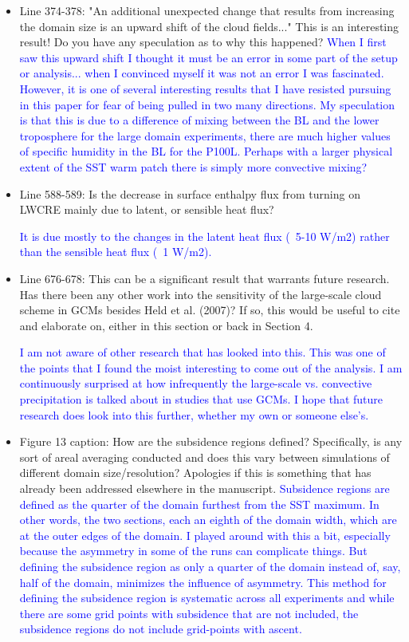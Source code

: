 \documentclass[draft]{agujournal2019}
\begin{document}
\begin{itemize}
  
  \item Line 374-378: "An additional unexpected change that results from increasing the domain size is an upward shift of the cloud fields..." This is an interesting result! Do you have any speculation as to why this happened?
  \textcolor{blue}{When I first saw this upward shift I thought it must be an error in some part of the setup or analysis... when I convinced myself it was not an error I was fascinated.  However, it is one of several interesting results that I have resisted
  pursuing in this paper for fear of being pulled in two many directions.  My speculation is that this is due to a difference of mixing between the BL and the lower troposphere for the large domain experiments, there are much higher values of specific humidity in the BL for the P100L.  Perhaps with a larger physical extent of the SST warm patch there is simply more convective mixing?}
  
  \item Line 588-589: Is the decrease in surface enthalpy flux from turning on LWCRE mainly due to latent, or sensible heat flux?  
  
  \textcolor{blue}{It is due mostly to the changes in the latent heat flux (~5-10 W/m2) rather than the sensible heat flux (~1 W/m2).}

  \item Line 676-678: This can be a significant result that warrants future research. Has there been any other work into the sensitivity of the large-scale cloud scheme in GCMs besides Held et al. (2007)? If so, this would be useful to cite and elaborate on, either in this section or back in Section 4.  
  
  \textcolor{blue}{I am not aware of other research that has looked into this.  This was one of the points that I found the moist interesting to come out of the analysis.  I am continuously surprised at how infrequently the large-scale vs. convective precipitation is talked about in studies that use GCMs.  I hope that future research does look into this further, whether my own or someone else’s.}
  
  \item Figure 13 caption: How are the subsidence regions defined? Specifically, is any sort of areal averaging conducted and does this vary between simulations of different domain size/resolution? Apologies if this is something that has already been addressed elsewhere in the manuscript.   
  \textcolor{blue}{Subsidence regions are defined as the quarter of the domain furthest from the SST 
  maximum.  In other words, the two sections, each an eighth of the domain width, which are at the outer edges of the domain.  I played around with this a bit, 
  especially because the asymmetry in some of the runs can complicate things.  But defining the subsidence region as only a quarter of the domain instead of, 
  say, half of the domain, minimizes the influence of asymmetry.  This method for defining the subsidence region is systematic across all experiments and while 
  there are some grid points with subsidence that are not included, the subsidence regions do not include grid-points with ascent.}
  
\end{itemize}
\end{document}
